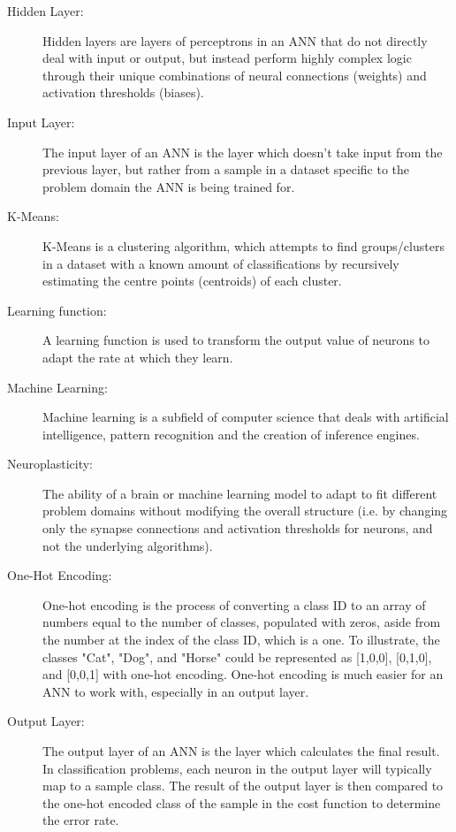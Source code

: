 \documentclass[]{report}
\begin{document}
\begin{description}
\item[Hidden Layer:] Hidden layers are layers of perceptrons in an ANN that do not directly deal with input or output, but instead perform highly complex logic through their unique combinations of neural connections (weights) and activation thresholds (biases).

\item[Input Layer:] The input layer of an ANN is the layer which doesn't take input from the previous layer, but rather from a sample in a dataset specific to the problem domain the ANN is being trained for.

\item[K-Means:] K-Means is a clustering algorithm, which attempts to find groups/clusters in a dataset with a known amount of classifications by recursively estimating the centre points (centroids) of each cluster.

\item[Learning function:] A learning function is used to transform the output value of neurons to adapt the rate at which they learn.

\item[Machine Learning:] Machine learning is a subfield of computer science that deals with artificial intelligence, pattern recognition and the creation of inference engines.

\item[Neuroplasticity:] The ability of a brain or machine learning model to adapt to fit different problem domains without modifying the overall structure (i.e. by changing only the synapse connections and activation thresholds for neurons, and not the underlying algorithms).

\item[One-Hot Encoding:] One-hot encoding is the process of converting a class ID to an array of numbers equal to the number of classes, populated with zeros, aside from the number at the index of the class ID, which is a one. To illustrate, the classes "Cat", "Dog", and "Horse" could be represented as [1,0,0], [0,1,0], and [0,0,1] with one-hot encoding. One-hot encoding is much easier for an ANN to work with, especially in an output layer.

\item[Output Layer:] The output layer of an ANN is the layer which calculates the final result. In classification problems, each neuron in the output layer will typically map to a sample class. The result of the output layer is then compared to the one-hot encoded class of the sample in the cost function to determine the error rate.


\end{description}
\end{document}
